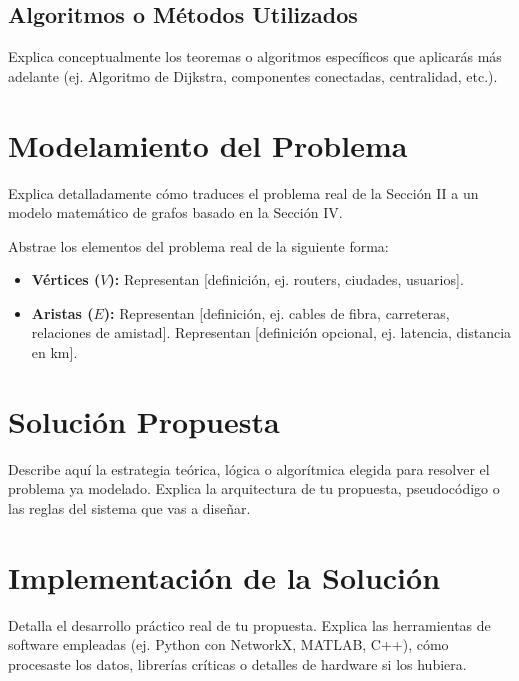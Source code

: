 \documentclass[conference]{IEEEtran}
\begin{document}
\subsection{Algoritmos o Métodos Utilizados}
Explica conceptualmente los teoremas o algoritmos específicos que aplicarás más adelante (ej. Algoritmo de Dijkstra, componentes conectadas, centralidad, etc.).

\section{Modelamiento del Problema}
Explica detalladamente cómo traduces el problema real de la Sección II a un modelo matemático de grafos basado en la Sección IV.

Abstrae los elementos del problema real de la siguiente forma:
\begin{itemize}
    \item \textbf{Vértices ($V$):} Representan [definición, ej. routers, ciudades, usuarios].
    \item \textbf{Aristas ($E$):} Representan [definición, ej. cables de fibra, carreteras, relaciones de amistad].
     Representan [definición opcional, ej. latencia, distancia en km].
\end{itemize}

\section{Solución Propuesta}
Describe aquí la estrategia teórica, lógica o algorítmica elegida para resolver el problema ya modelado. Explica la arquitectura de tu propuesta, pseudocódigo o las reglas del sistema que vas a diseñar.

\section{Implementación de la Solución}
Detalla el desarrollo práctico real de tu propuesta. Explica las herramientas de software empleadas (ej. Python con NetworkX, MATLAB, C++), cómo procesaste los datos, librerías críticas o detalles de hardware si los hubiera.
\end{document}
